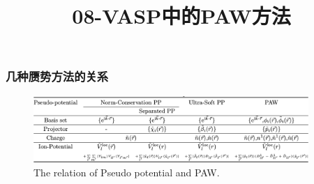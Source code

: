 \frame
{
	\frametitle{几种赝势方法的关系}
\begin{figure}[h!]
\centering
\includegraphics[height=1.0in,width=4.1in,clip]{Figures/Pseudo-Potential.png}
\caption{\tiny \textrm{The relation of Pseudo potential and PAW.}}%
\label{Pseudo_Potential_PAW}
\end{figure}
}
\title{08-\rm{VASP}中的\rm{PAW}方法}
%


